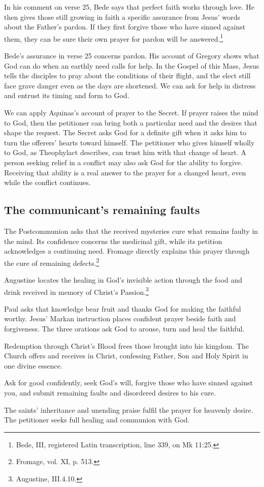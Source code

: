 In his comment on verse 25, Bede says that perfect faith works
through love. He then gives those still growing in faith a
specific assurance from Jesus' words about the Father's pardon.
If they first forgive those who have sinned against them, they
can be sure their own prayer for pardon will be answered.\footnote{Bede,
III, registered Latin transcription, line 339, on Mk 11:25.}

Bede's assurance in verse 25 concerns pardon. His account of
Gregory shows what God can do when an earthly need calls for
help. In the Gospel of this Mass, Jesus tells the disciples
to pray about the conditions of their flight, and the elect
still face grave danger even as the days are shortened. We
can ask for help in distress and entrust its timing and
form to God.

We can apply Aquinas's account of prayer to the Secret. If
prayer raises the mind to God, then the petitioner can bring
both a particular need and the desires that shape the request.
The Secret asks God for a definite gift when it asks him to
turn the offerers' hearts toward himself. The petitioner who
gives himself wholly to God, as Theophylact describes, can
trust him with that change of heart. A person seeking relief
in a conflict may also ask God for the ability to forgive.
Receiving that ability is a real answer to the prayer for a
changed heart, even while the conflict continues.

\subsection{The communicant's remaining faults}

The Postcommunion asks that
the received mysteries cure
what remains faulty in
the mind. Its confidence
concerns the medicinal
gift, while its petition
acknowledges a continuing
need. Fromage directly
explains this prayer
through the cure of
remaining defects.\footnote{Fromage,
vol. XI, p. 513.}

Augustine locates the healing in God's invisible action through
the food and drink received in memory of Christ's Passion.\footnote{Augustine,
 III.4.10.}

\begin{fourSenses}
\item[Literal.] Paul asks that
knowledge bear fruit and
thanks God for making
the faithful worthy.
Jesus' Markan instruction
places confident prayer
beside faith and
forgiveness. The three
orations ask God to
arouse, turn and heal
the faithful.
\item[Allegorical.] Redemption
through Christ's Blood
frees those brought
into his kingdom.
The Church offers
and receives in
Christ, confessing
Father, Son and
Holy Spirit in
one divine essence.
\item[Moral.] Ask for
good confidently,
seek God's will,
forgive those who
have sinned against
you, and submit
remaining faults
and disordered desires
to his cure.
\item[Anagogical.] The
saints' inheritance
and unending praise
fulfil the prayer
for heavenly desire.
The petitioner seeks
full healing and
communion with God.
\end{fourSenses}
